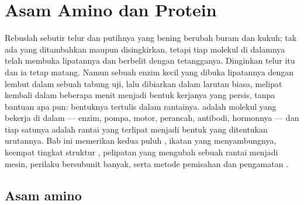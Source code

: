 \chapter{Asam Amino dan Protein}\label{ch:b1:proteins}

Rebuslah sebutir telur dan putihnya yang bening berubah buram dan
kukuh; tak ada yang ditambahkan maupun disingkirkan, tetapi tiap
molekul  di dalamnya telah membuka lipatannya dan berbelit dengan
tetangganya. Dinginkan telur itu dan ia tetap matang. Namun sebuah enzim
kecil yang dibuka lipatannya dengan lembut dalam sebuah tabung uji, lalu
dibiarkan dalam larutan  biasa, melipat kembali dalam beberapa
menit menjadi bentuk kerjanya yang persis, tanpa bantuan apa pun:
bentuknya tertulis dalam rantainya.  adalah molekul yang bekerja
di dalam  --- enzim, pompa, motor, perancah, antibodi, hormonnya ---
dan tiap satunya adalah rantai  yang terlipat menjadi bentuk
yang ditentukan urutannya. Bab ini memerikan kedua puluh ,
ikatan yang menyambungnya, keempat tingkat struktur , pelipatan
yang mengubah sebuah rantai menjadi mesin, perilaku  
bersubunit banyak, serta metode pemisahan dan pengamatan .

\section{Asam amino}

